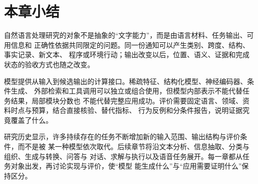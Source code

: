 \section{本章小结}
\label{sec:nlp-introduction-summary}

自然语言处理研究的对象不是抽象的“文字能力”，而是由语言材料、任务输出、可用信息和
正确性依据共同限定的问题。同一份通知可以产生类别、跨度、结构、事实记录、新文本、
程序或环境行动；输出改变以后，位置、语义、证据和完成状态的验收方式也随之改变。

模型提供从输入到候选输出的计算接口。稀疏特征、结构化模型、神经编码器、条件生成、
外部检索和工具调用可以独立或组合使用，但模型内部表示不能代替任务结果，局部模块分数也
不能代替完整应用成功。评价需要固定语言、领域、资料时点与预算，结合直接核验、替代指标、
行为反例和分条件报告，说明证据究竟覆盖了什么。

研究历史显示，许多持续存在的任务不断增加新的输入范围、输出结构与评价条件，而不是被
某一种模型依次取代。后续章节将沿文本分析、信息抽取、分类与组织、生成与转换、问答与
对话、求解与执行以及语音任务展开。每一章都从任务对象出发，再讨论实现与评价，使“模型
能生成什么”与“应用需要证明什么”保持区分。
